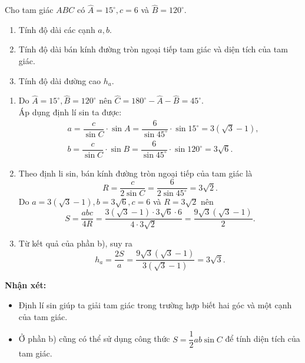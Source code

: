 \begin{bt}%
	Cho tam giác $ABC$ có $\widehat{A}=15^\circ, c=6$ và $\widehat{B}=120^\circ$.
	\begin{enumerate}
		\item Tính độ dài các cạnh $a, b$.
		\item Tính độ dài bán kính đường tròn ngoại tiếp tam giác và diện tích của tam giác.
		\item Tính độ dài đường cao $h_a$.
	\end{enumerate}
	\loigiai
	{
	\begin{enumerate}
		\item Do $\widehat{A}=15^\circ, \widehat{B}=120^\circ$ nên $\widehat{C}=180^\circ-\widehat{A}-\widehat{B}=45^\circ$.\\
		Áp dụng định lí sin ta được:
		$$
		\begin{aligned}
		&a=\dfrac{c}{\sin C}\cdot\sin A=\dfrac{6}{\sin 45^\circ}\cdot\sin 15^\circ=3(\sqrt{3}-1),\\
		&b=\dfrac{c}{\sin C}\cdot\sin B=\dfrac{6}{\sin 45^\circ}\cdot\sin 120^\circ=3\sqrt{6}.
		\end{aligned}$$
		\item Theo định li sin, bán kính đường tròn ngoại tiếp của tam giác là
		$$R=\dfrac{c}{2\sin C}=\dfrac{6}{2\sin 45^\circ}=3\sqrt{2}.$$
		Do $a=3(\sqrt{3}-1), b=3\sqrt{6}, c=6$ và $R=3\sqrt{2}$ nên
		$$S=\dfrac{a b c}{4R}=\dfrac{3(\sqrt{3}-1)\cdot 3\sqrt{6}\cdot 6}{4\cdot 3\sqrt{2}}=\dfrac{9\sqrt{3}(\sqrt{3}-1)}{2}.$$
		\item Từ kết quả của phần b), suy ra $$h_a=\dfrac{2S}{a}=\dfrac{9\sqrt{3}(\sqrt{3}-1)}{3(\sqrt{3}-1)}=3\sqrt{3}.$$
	\end{enumerate}
	\textbf{Nhận xét:}
	\begin{itemize}
		\item Định lí sin giúp ta giải tam giác trong trường hợp biết hai góc và một cạnh của tam giác.
		\item Ở phần b) cũng có thể sử dụng công thức $S=\dfrac{1}{2}ab\sin C$ để tính diện tích của tam giác.
	\end{itemize}		
	}
\end{bt}

